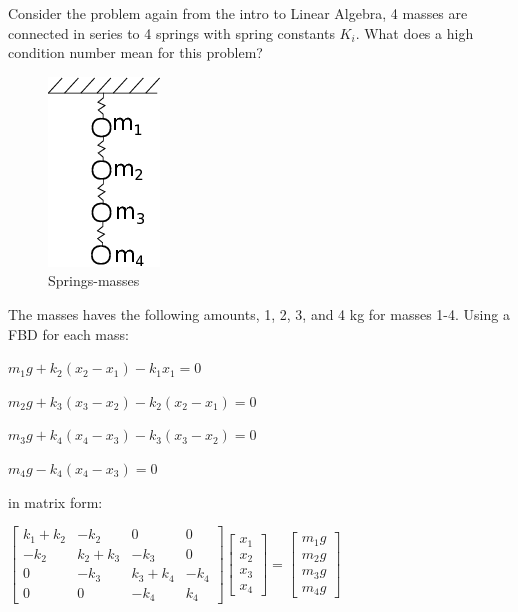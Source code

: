 \documentclass[11pt]{article}
\makeatletter
\def\maxwidth{\ifdim\Gin@nat@width>\linewidth\linewidth
    \else\Gin@nat@width\fi}
\let\Oldincludegraphics\includegraphics
\renewcommand{\includegraphics}[1]{\Oldincludegraphics[width=.8\maxwidth]{#1}}
\makeatother
\begin{document}
    Consider the problem again from the intro to Linear Algebra, 4 masses
are connected in series to 4 springs with spring constants \(K_{i}\).
What does a high condition number mean for this problem?

\begin{figure}[htbp]
\centering
\includegraphics{../lecture_09/mass_springs.png}
\caption{Springs-masses}
\end{figure}

The masses haves the following amounts, 1, 2, 3, and 4 kg for masses
1-4. Using a FBD for each mass:

\(m_{1}g+k_{2}(x_{2}-x_{1})-k_{1}x_{1}=0\)

\(m_{2}g+k_{3}(x_{3}-x_{2})-k_{2}(x_{2}-x_{1})=0\)

\(m_{3}g+k_{4}(x_{4}-x_{3})-k_{3}(x_{3}-x_{2})=0\)

\(m_{4}g-k_{4}(x_{4}-x_{3})=0\)

in matrix form:

\(\left[ \begin{array}{cccc} k_{1}+k_{2} & -k_{2} & 0 & 0 \\ -k_{2} & k_{2}+k_{3} & -k_{3} & 0 \\ 0 & -k_{3} & k_{3}+k_{4} & -k_{4} \\ 0 & 0 & -k_{4} & k_{4} \end{array} \right] \left[ \begin{array}{c} x_{1} \\ x_{2} \\ x_{3} \\ x_{4} \end{array} \right]= \left[ \begin{array}{c} m_{1}g \\ m_{2}g \\ m_{3}g \\ m_{4}g \end{array} \right]\)
\end{document}
